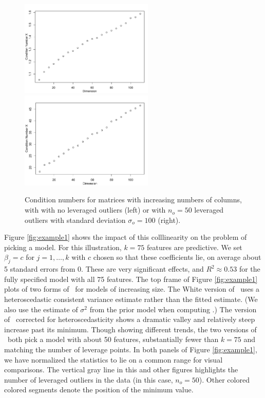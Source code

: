 \documentclass[12pt]{article}
\begin{document}
 \begin{figure}
 \caption{ Condition numbers for matrices with increasing numbers of columns,
 with with no leveraged outliers (left) or with $n_o=50$ leveraged outliers with
 standard deviation $\sigma_o=100$ (right). } 
 \label{fig:cn}
 \centerline{\includegraphics[width=2.5in]{figures/cn1.pdf}
             \includegraphics[width=2.5in]{figures/cn100.pdf}}
 \end{figure}


 Figure \ref{fig:example1} shows the impact of this colllinearity on the problem
 of picking a model. For this illustration, $k = 75$ features are predictive.
  We set $\beta_j = c$ for $j = 1,\ldots,k$ with $c$ chosen so that these
 coefficients lie, on average about 5 standard errors from 0.  These are very
 significant effects, and $R^2 \approx 0.53$ for the fully specified model with
 all 75 features.  The top frame of Figure \ref{fig:example1} plots of two forms
 of \aic\ for models of increasing size.  The White version of \aic\ uses a
 heteroscedastic consistent variance estimate rather than the fitted
 estimate. (We also use the estimate of $\sigma^2$ from the prior model when
 computing \aic.) The version of \aic\ corrected for heteroscedasticity shows a
 dramatic valley and relatively steep increase past its minimum.  Though showing
 different trends, the two versions of \aic\ both pick a model with about 50
 features, substantially fewer than $k=75$ and matching the number of leverage
 points.  In both panels of Figure \ref{fig:example1}, we have normalized the
 statistics to lie on a common range for visual comparisons.  The vertical gray
 line in this and other figures highlights the number of leveraged outliers in
 the data (in this case, $n_o=50$).  Other colored colored segments denote the
 position of the minimum value.
\end{document}
